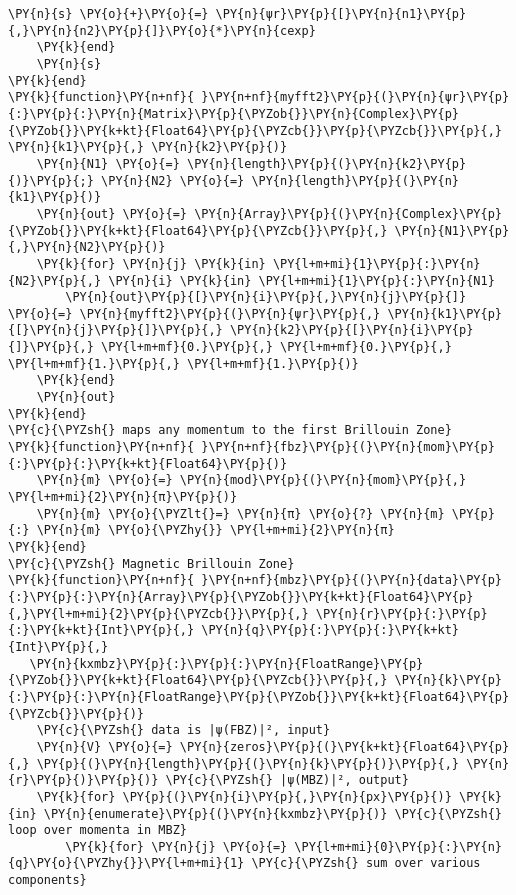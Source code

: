 \begin{Verbatim}[commandchars=\\\{\}]
        \PY{n}{s} \PY{o}{+}\PY{o}{=} \PY{n}{ψr}\PY{p}{[}\PY{n}{n1}\PY{p}{,}\PY{n}{n2}\PY{p}{]}\PY{o}{*}\PY{n}{cexp}
    \PY{k}{end}
    \PY{n}{s}
\PY{k}{end}
\PY{k}{function}\PY{n+nf}{ }\PY{n+nf}{myfft2}\PY{p}{(}\PY{n}{ψr}\PY{p}{:}\PY{p}{:}\PY{n}{Matrix}\PY{p}{\PYZob{}}\PY{n}{Complex}\PY{p}{\PYZob{}}\PY{k+kt}{Float64}\PY{p}{\PYZcb{}}\PY{p}{\PYZcb{}}\PY{p}{,} \PY{n}{k1}\PY{p}{,} \PY{n}{k2}\PY{p}{)}
    \PY{n}{N1} \PY{o}{=} \PY{n}{length}\PY{p}{(}\PY{n}{k2}\PY{p}{)}\PY{p}{;} \PY{n}{N2} \PY{o}{=} \PY{n}{length}\PY{p}{(}\PY{n}{k1}\PY{p}{)}
    \PY{n}{out} \PY{o}{=} \PY{n}{Array}\PY{p}{(}\PY{n}{Complex}\PY{p}{\PYZob{}}\PY{k+kt}{Float64}\PY{p}{\PYZcb{}}\PY{p}{,} \PY{n}{N1}\PY{p}{,}\PY{n}{N2}\PY{p}{)}
    \PY{k}{for} \PY{n}{j} \PY{k}{in} \PY{l+m+mi}{1}\PY{p}{:}\PY{n}{N2}\PY{p}{,} \PY{n}{i} \PY{k}{in} \PY{l+m+mi}{1}\PY{p}{:}\PY{n}{N1}
        \PY{n}{out}\PY{p}{[}\PY{n}{i}\PY{p}{,}\PY{n}{j}\PY{p}{]} \PY{o}{=} \PY{n}{myfft2}\PY{p}{(}\PY{n}{ψr}\PY{p}{,} \PY{n}{k1}\PY{p}{[}\PY{n}{j}\PY{p}{]}\PY{p}{,} \PY{n}{k2}\PY{p}{[}\PY{n}{i}\PY{p}{]}\PY{p}{,} \PY{l+m+mf}{0.}\PY{p}{,} \PY{l+m+mf}{0.}\PY{p}{,} \PY{l+m+mf}{1.}\PY{p}{,} \PY{l+m+mf}{1.}\PY{p}{)}
    \PY{k}{end}
    \PY{n}{out}
\PY{k}{end}
\PY{c}{\PYZsh{} maps any momentum to the first Brillouin Zone}
\PY{k}{function}\PY{n+nf}{ }\PY{n+nf}{fbz}\PY{p}{(}\PY{n}{mom}\PY{p}{:}\PY{p}{:}\PY{k+kt}{Float64}\PY{p}{)}
    \PY{n}{m} \PY{o}{=} \PY{n}{mod}\PY{p}{(}\PY{n}{mom}\PY{p}{,} \PY{l+m+mi}{2}\PY{n}{π}\PY{p}{)}
    \PY{n}{m} \PY{o}{\PYZlt{}=} \PY{n}{π} \PY{o}{?} \PY{n}{m} \PY{p}{:} \PY{n}{m} \PY{o}{\PYZhy{}} \PY{l+m+mi}{2}\PY{n}{π}
\PY{k}{end}
\PY{c}{\PYZsh{} Magnetic Brillouin Zone}
\PY{k}{function}\PY{n+nf}{ }\PY{n+nf}{mbz}\PY{p}{(}\PY{n}{data}\PY{p}{:}\PY{p}{:}\PY{n}{Array}\PY{p}{\PYZob{}}\PY{k+kt}{Float64}\PY{p}{,}\PY{l+m+mi}{2}\PY{p}{\PYZcb{}}\PY{p}{,} \PY{n}{r}\PY{p}{:}\PY{p}{:}\PY{k+kt}{Int}\PY{p}{,} \PY{n}{q}\PY{p}{:}\PY{p}{:}\PY{k+kt}{Int}\PY{p}{,}
   \PY{n}{kxmbz}\PY{p}{:}\PY{p}{:}\PY{n}{FloatRange}\PY{p}{\PYZob{}}\PY{k+kt}{Float64}\PY{p}{\PYZcb{}}\PY{p}{,} \PY{n}{k}\PY{p}{:}\PY{p}{:}\PY{n}{FloatRange}\PY{p}{\PYZob{}}\PY{k+kt}{Float64}\PY{p}{\PYZcb{}}\PY{p}{)}
    \PY{c}{\PYZsh{} data is |ψ(FBZ)|², input}
    \PY{n}{V} \PY{o}{=} \PY{n}{zeros}\PY{p}{(}\PY{k+kt}{Float64}\PY{p}{,} \PY{p}{(}\PY{n}{length}\PY{p}{(}\PY{n}{k}\PY{p}{)}\PY{p}{,} \PY{n}{r}\PY{p}{)}\PY{p}{)} \PY{c}{\PYZsh{} |ψ(MBZ)|², output}
    \PY{k}{for} \PY{p}{(}\PY{n}{i}\PY{p}{,}\PY{n}{px}\PY{p}{)} \PY{k}{in} \PY{n}{enumerate}\PY{p}{(}\PY{n}{kxmbz}\PY{p}{)} \PY{c}{\PYZsh{} loop over momenta in MBZ}
        \PY{k}{for} \PY{n}{j} \PY{o}{=} \PY{l+m+mi}{0}\PY{p}{:}\PY{n}{q}\PY{o}{\PYZhy{}}\PY{l+m+mi}{1} \PY{c}{\PYZsh{} sum over various components}

\end{Verbatim}
